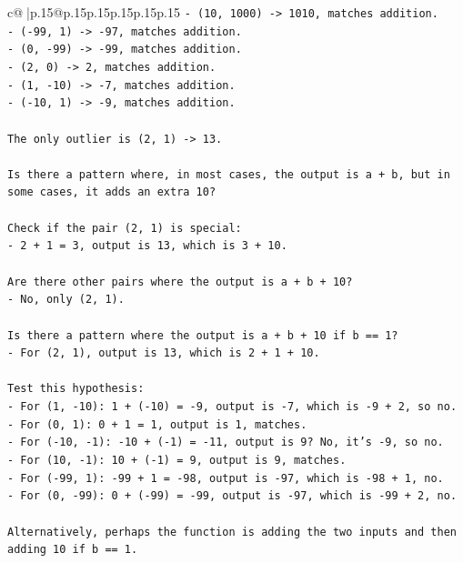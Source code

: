 \documentclass{article}
\begin{document}
{\begin{supertabular}{c@{$\;$}|p{.15\linewidth}@{}p{.15\linewidth}p{.15\linewidth}p{.15\linewidth}p{.15\linewidth}p{.15\linewidth}}
{{{\texttt{{-} (10, 1000) {-}> 1010, matches addition.} \\
\texttt{{-} ({-}99, 1) {-}> {-}97, matches addition.} \\
\texttt{{-} (0, {-}99) {-}> {-}99, matches addition.} \\
\texttt{{-} (2, 0) {-}> 2, matches addition.} \\
\texttt{{-} (1, {-}10) {-}> {-}7, matches addition.} \\
\texttt{{-} ({-}10, 1) {-}> {-}9, matches addition.} \\
\\ 
\texttt{The only outlier is (2, 1) {-}> 13.} \\
\\ 
\texttt{Is there a pattern where, in most cases, the output is a + b, but in some cases, it adds an extra 10?} \\
\\ 
\texttt{Check if the pair (2, 1) is special:} \\
\texttt{{-} 2 + 1 = 3, output is 13, which is 3 + 10.} \\
\\ 
\texttt{Are there other pairs where the output is a + b + 10?} \\
\texttt{{-} No, only (2, 1).} \\
\\ 
\texttt{Is there a pattern where the output is a + b + 10 if b == 1?} \\
\texttt{{-} For (2, 1), output is 13, which is 2 + 1 + 10.} \\
\\ 
\texttt{Test this hypothesis:} \\
\texttt{{-} For (1, {-}10): 1 + ({-}10) = {-}9, output is {-}7, which is {-}9 + 2, so no.} \\
\texttt{{-} For (0, 1): 0 + 1 = 1, output is 1, matches.} \\
\texttt{{-} For ({-}10, {-}1): {-}10 + ({-}1) = {-}11, output is 9? No, it's {-}9, so no.} \\
\texttt{{-} For (10, {-}1): 10 + ({-}1) = 9, output is 9, matches.} \\
\texttt{{-} For ({-}99, 1): {-}99 + 1 = {-}98, output is {-}97, which is {-}98 + 1, no.} \\
\texttt{{-} For (0, {-}99): 0 + ({-}99) = {-}99, output is {-}97, which is {-}99 + 2, no.} \\
\\ 
\texttt{Alternatively, perhaps the function is adding the two inputs and then adding 10 if b == 1.} \\
}}}
\end{supertabular}}
\end{document}
